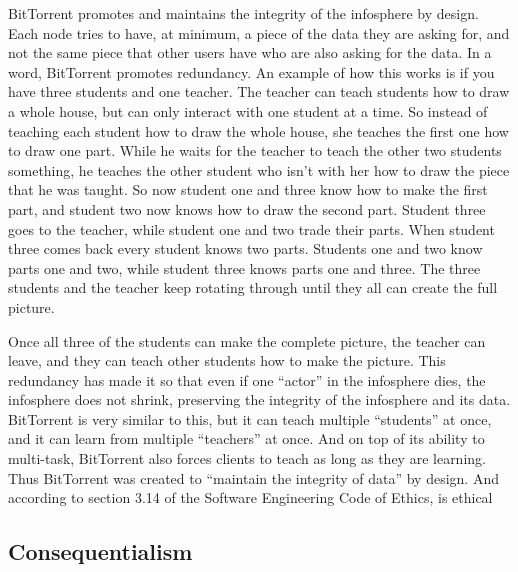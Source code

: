 \documentclass[11pt]{article}
\begin{document}
BitTorrent promotes and maintains the integrity of the infosphere by design. Each node tries to have, at minimum, a piece of the data they are asking for, and not the same piece that other users have who are also asking for the data. In a word, BitTorrent promotes redundancy. An example of how this works is if you have three students and one teacher. The teacher can teach students how to draw a whole house, but can only interact with one student at a time. So instead of teaching each student how to draw the whole house, she teaches the first one how to draw one part. While he waits for the teacher to teach the other two students something, he teaches the other student who isn't with her how to draw the piece that he was taught. So now student one and three know how to make the first part, and student two now knows how to draw the second part. Student three goes to the teacher, while student one and two trade their parts. When student three comes back every student knows two parts. Students one and two know parts one and two, while student three knows parts one and three. The three students and the teacher keep rotating through until they all can create the full picture.

Once all three of the students can make the complete picture, the teacher can leave, and they can teach other students how to make the picture. This redundancy has made it so that even if one ``actor'' in the infosphere dies, the infosphere does not shrink, preserving the integrity of the infosphere and its data. BitTorrent is very similar to this, but it can teach multiple ``students'' at once, and it can learn from multiple ``teachers'' at once. And on top of its ability to multi-task, BitTorrent also forces clients to teach as long as they are learning. Thus BitTorrent was created to ``maintain the integrity of data'' by design. And according to section 3.14 of the Software Engineering Code of Ethics, is ethical

\subsection{Consequentialism}

\end{document}
